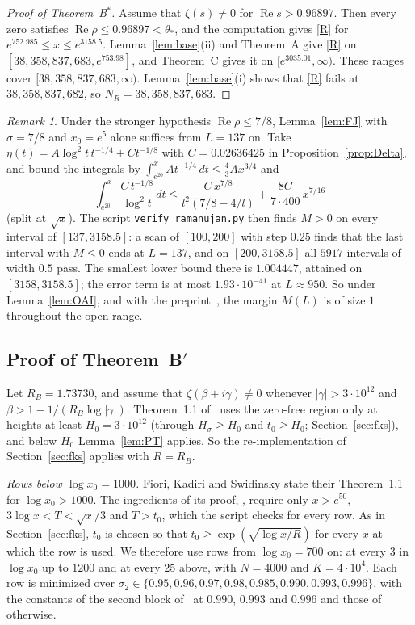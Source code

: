 \documentclass{amsart}
\theoremstyle{definition}
\theoremstyle{remark}
\newtheorem{remark}[theorem]{Remark}
\theoremstyle{plain}
\numberwithin{equation}{section}
\newcommand{\NN}{38{,}358{,}837{,}683}
\newcommand{\NNm}{38{,}358{,}837{,}682}
\newcommand{\Bp}{B$'$}
\newcommand{\Bstar}{B$^*$}
\begin{document}
\begin{proof}[Proof of Theorem~\Bstar]
Assume that $\zeta(s)\ne0$ for $\operatorname{Re}s>0.96897$. Then every zero satisfies $\operatorname{Re}\rho\le0.96897<\theta_*$, and the computation gives \eqref{R} for $e^{752.985}\le x\le e^{3158.5}$. Lemma~\ref{lem:base}(ii) and Theorem~A give \eqref{R} on $[\NN,\allowbreak e^{753.98}]$, and Theorem~C gives it on $[e^{3035.01},\allowbreak\infty)$. These ranges cover $[\NN,\infty)$. Lemma~\ref{lem:base}(i) shows that \eqref{R} fails at $\NNm$, so $N_R=\NN$.
\end{proof}

\begin{remark}\label{rem:78}
Under the stronger hypothesis $\operatorname{Re}\rho\le7/8$, Lemma~\ref{lem:FJ} with $\sigma=7/8$ and $x_0=e^5$ alone suffices from $L=137$ on. Take $\eta(t)=A\log^2t\,t^{-1/4}+Ct^{-1/8}$ with $C=0.02636425$ in Proposition~\ref{prop:Delta}, and bound the integrals by $\int_{e^{20}}^xAt^{-1/4}\,dt\le\frac43Ax^{3/4}$ and
\[
\int_{e^{20}}^x\frac{C\,t^{-1/8}}{\log^2t}\,dt\le\frac{C\,x^{7/8}}{l^2(7/8-4/l)}+\frac{8C}{7\cdot400}\,x^{7/16}
\]
(split at $\sqrt x$). The script \texttt{verify\_ramanujan.py} then finds $M>0$ on every interval of $[137,3158.5]$: a scan of $[100,200]$ with step $0.25$ finds that the last interval with $M\le0$ ends at $L=137$, and on $[200,3158.5]$ all $5917$ intervals of width $0.5$ pass. The smallest lower bound there is $1.004447$, attained on $[3158,3158.5]$; the error term is at most $1.93\cdot10^{-41}$ at $L\approx950$. So under Lemma~\ref{lem:OAI}, and with the preprint~\cite{FJ26}, the margin $M(L)$ is of size $1$ throughout the open range.
\end{remark}

\subsection{\texorpdfstring{Proof of Theorem~\Bp}{Proof of Theorem B'}}\label{sec:Bprime}

Let $R_B=1.73730$, and assume that $\zeta(\beta+i\gamma)\ne0$ whenever $|\gamma|>3\cdot10^{12}$ and $\beta>1-1/(R_B\log|\gamma|)$. Theorem~1.1 of~\cite{FKS23} uses the zero-free region only at heights at least $H_0=3\cdot10^{12}$ (through $H_\sigma\ge H_0$ and $t_0\ge H_0$; Section~\ref{sec:fks}), and below $H_0$ Lemma~\ref{lem:PT} applies. So the re-implementation of Section~\ref{sec:fks} applies with $R=R_B$.

\emph{Rows below $\log x_0=1000$.} Fiori, Kadiri and Swidinsky state their Theorem~1.1 for $\log x_0>1000$. The ingredients of its proof, \cite[Props.~3.4, 3.6, 3.8, 3.11 and~3.14]{FKS23}, require only $x>e^{50}$, $3\log x<T<\sqrt x/3$ and $T>t_0$, which the script checks for every row. As in Section~\ref{sec:fks}, $t_0$ is chosen so that $t_0\ge\exp(\sqrt{\log x/R})$ for every $x$ at which the row is used. We therefore use rows from $\log x_0=700$ on: at every $3$ in $\log x_0$ up to $1200$ and at every $25$ above, with $N=4000$ and $K=4\cdot10^4$. Each row is minimized over $\sigma_2\in\{0.95,0.96,0.97,0.98,0.985,0.990,0.993,0.996\}$, with the constants of the second block of~\cite[Table~7]{FKS23} at $0.990$, $0.993$ and $0.996$ and those of~\cite[Table~8]{FKS23} otherwise.
\end{document}
